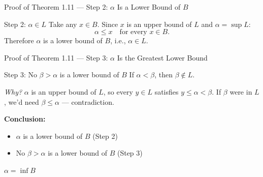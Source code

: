 \documentclass[aspectratio=169,12pt,t]{beamer}
\begin{document}
{%
\begin{frame}{Proof of Theorem 1.11 --- Step 2: $\alpha$ Is a Lower Bound of $B$}
  \begin{proofblock}{Step 2: $\alpha \in L$}
    Take any $x \in B$. Since $x$ is an upper bound of $L$ and $\alpha = \sup L$:
    \[
      \alpha \leq x \quad \text{for every } x \in B.
    \]
    Therefore $\alpha$ is a lower bound of $B$, i.e., $\alpha \in L$.
  \end{proofblock}

\end{frame}

\begin{frame}{Proof of Theorem 1.11 --- Step 3: $\alpha$ Is the Greatest Lower Bound}
  \begin{proofblock}{Step 3: No $\beta > \alpha$ is a lower bound of $B$}
    If $\alpha < \beta$, then $\beta \notin L$.

    \vspace{0.3em}
    \emph{Why?} $\alpha$ is an upper bound of $L$, so every $y \in L$ satisfies
    $y \leq \alpha < \beta$. If $\beta$ were in $L$, we'd need $\beta \leq \alpha$ --- contradiction.
  \end{proofblock}

  \vspace{0.5em}
  \begin{hlbox}
    \textbf{Conclusion:}
    \begin{itemize}
      \item $\alpha$ is a lower bound of $B$ \hfill (Step 2)
      \item No $\beta > \alpha$ is a lower bound of $B$ \hfill (Step 3)
    \end{itemize}

    \vspace{0.3em}
    $\boxed{\alpha = \inf B}$
  \end{hlbox}


\end{frame}}
\end{document}
